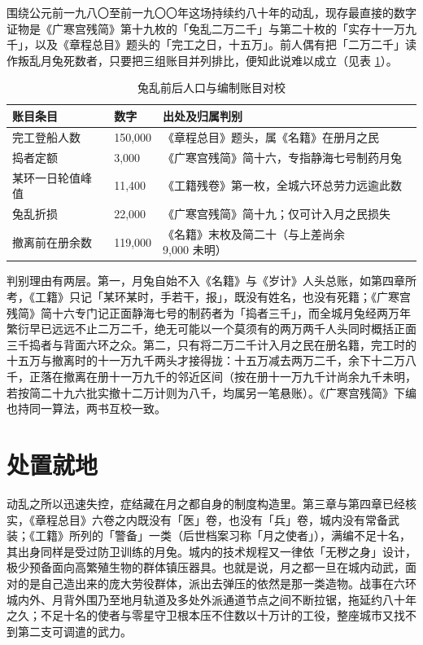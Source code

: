 围绕公元前一九八〇至前一九〇〇年这场持续约八十年的动乱，现存最直接的数字证物是《广寒宫残简》第十九枚的「兔乱二万二千」与第二十枚的「实存十一万九千」，以及《章程总目》题头的「完工之日，十五万」。前人偶有把「二万二千」读作叛乱月兔死数者，只要把三组账目并列排比，便知此说难以成立（见表 \ref{tab:revolt-tally}）。

\begin{table}[htbp]
  \centering
  \caption{兔乱前后人口与编制账目对校}
  \label{tab:revolt-tally}
  \footnotesize
  \begin{tabular}{@{}p{28mm}p{24mm}p{68mm}@{}}
    \toprule
    账目条目 & 数字 & 出处及归属判别 \\
    \midrule
    完工登船人数 & 150{,}000 & 《章程总目》题头，属《名籍》在册月之民 \\
    捣者定额 & 3{,}000 & 《广寒宫残简》简十六，专指静海七号制药月兔 \\
    某环一日轮值峰值 & 11{,}400 & 《工籍残卷》第一枚，全城六环总劳力远逾此数 \\
    兔乱折损 & 22{,}000 & 《广寒宫残简》简十九；仅可计入月之民损失 \\
    撤离前在册余数 & 119{,}000 & 《名籍》末枚及简二十（与上差尚余 9{,}000 未明） \\
    \bottomrule
  \end{tabular}
\end{table}

判别理由有两层。第一，月兔自始不入《名籍》与《岁计》人头总账，如第四章所考，《工籍》只记「某环某时，手若干，报」，既没有姓名，也没有死籍；《广寒宫残简》简十六专门记正面静海七号的制药者为「捣者三千」，而全城月兔经两万年繁衍早已远远不止二万二千，绝无可能以一个莫须有的两万两千人头同时概括正面三千捣者与背面六环之众。第二，只有将二万二千计入月之民在册名籍，完工时的十五万与撤离时的十一万九千两头才接得拢：十五万减去两万二千，余下十二万八千，正落在撤离在册十一万九千的邻近区间（按在册十一万九千计尚余九千未明，若按简二十九六批实撤十二万计则为八千，均属另一笔悬账）。《广寒宫残简》下编也持同一算法，两书互校一致。

\section{处置就地}

动乱之所以迅速失控，症结藏在月之都自身的制度构造里。第三章与第四章已经核实，《章程总目》六卷之内既没有「医」卷，也没有「兵」卷，城内没有常备武装；《工籍》所列的「警备」一类（后世档案习称「月之使者」），满编不足十名，其出身同样是受过防卫训练的月兔。城内的技术规程又一律依「无秽之身」设计，极少预备面向高繁殖生物的群体镇压器具。也就是说，月之都一旦在城内动武，面对的是自己造出来的庞大劳役群体，派出去弹压的依然是那一类造物。战事在六环城内外、月背外围乃至地月轨道及多处外派通道节点之间不断拉锯，拖延约八十年之久；不足十名的使者与零星守卫根本压不住数以十万计的工役，整座城市又找不到第二支可调遣的武力。

